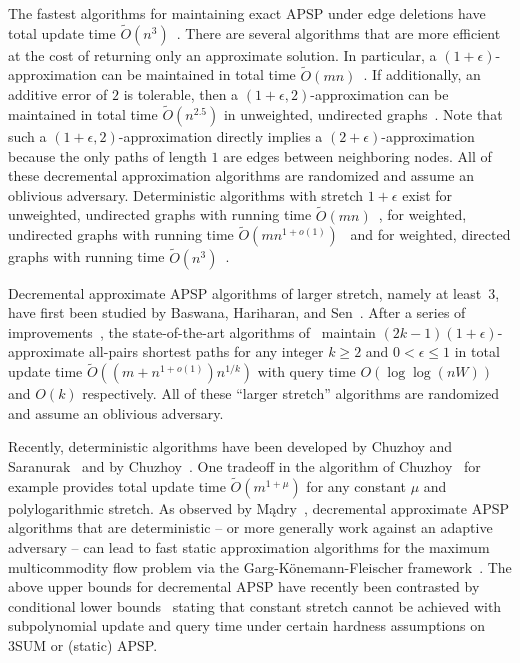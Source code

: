 \documentclass[11pt]{article}
\theoremstyle{definition}
\theoremstyle{remark}
\begin{document}
\begin{titlepage}
The fastest algorithms for maintaining exact APSP under edge deletions have total update time $ \tilde O (n^3) $~\cite{DemetrescuI06,BaswanaHS07,EvaldFGW21}.
There are several algorithms that are more efficient at the cost of returning only an approximate solution.
In particular, a $ (1+\epsilon) $-approximation can be maintained in total time $ \tilde O (m n) $~\cite{RZ12,Bernstein16,KarczmarzL19}.
If additionally, an additive error of $ 2 $ is tolerable, then a $ (1+\epsilon, 2) $-approximation can be maintained in total time $ \tilde O (n^{2.5}) $ in unweighted, undirected graphs~\cite{HKN2016,AbrahamC13}.
Note that such a $ (1+\epsilon, 2) $-approximation directly implies a $ (2 + \epsilon) $-approximation because the only paths of length $ 1 $ are edges between neighboring nodes.
All of these decremental approximation algorithms are randomized and assume an oblivious adversary.
Deterministic algorithms with stretch $ 1 + \epsilon $ exist for unweighted, undirected graphs with running time $ \tilde O (m n) $~\cite{HKN2016}, for weighted, undirected graphs with running time $ \tilde O (m n^{1+o(1)})$~\cite{BernsteinGS21} and for weighted, directed graphs with running time $ \tilde O (n^3) $~\cite{KarczmarzL20}.

Decremental approximate APSP algorithms of larger stretch, namely at least~$ 3 $, have first been studied by Baswana, Hariharan, and Sen~\cite{BaswanaHS03}.
After a series of improvements~\cite{RZ12, BR11, AbrahamCT14, henzinger2014decremental}, the state-of-the-art algorithms of~\cite{Chechik18,LN2020} maintain $ (2k-1)(1 + \epsilon) $-approximate all-pairs shortest paths for any integer $ k \geq 2 $ and $ 0 < \epsilon \leq 1 $ in total update time $ \tilde O ( (m+n^{1+o(1)})n^{1/k}) $ with query time  $O(\log \log (nW))$ and $O(k)$ respectively.
All of these ``larger stretch'' algorithms are randomized and assume an oblivious adversary.

Recently, deterministic algorithms have been developed by Chuzhoy and Saranurak~\cite{ChuzhoyS21} and by Chuzhoy~\cite{Chuzhoy21}.
One tradeoff in the algorithm of Chuzhoy~\cite{Chuzhoy21} for example provides total update time $ \tilde O (m^{1 + \mu}) $ for any constant $ \mu $ and polylogarithmic stretch.
As observed by Mądry~\cite{Madry10}, decremental approximate APSP algorithms that are deterministic -- or more generally work against an adaptive adversary -- can lead to fast static approximation algorithms for the maximum multicommodity flow problem via the Garg-Könemann-Fleischer framework~\cite{GargK07,Fleischer00}.
The above upper bounds for decremental APSP have recently been contrasted by conditional lower bounds~\cite{AbboudBKZ22} stating that constant stretch cannot be achieved with subpolynomial update and query time under certain hardness assumptions on 3SUM or (static) APSP.



\end{titlepage}
\end{document}
